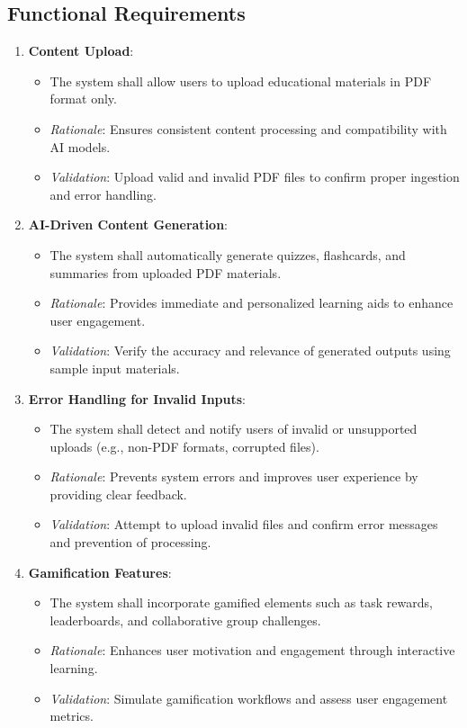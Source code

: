 \documentclass[12pt]{article}
\begin{document}
\subsection{Functional Requirements}
\begin{enumerate}

    \item \textbf{Content Upload}:
        \begin{itemize}
            \item The system shall allow users to upload educational materials in PDF format only.
            \item \textit{Rationale}: Ensures consistent content processing and compatibility with AI models.
            \item \textit{Validation}: Upload valid and invalid PDF files to confirm proper ingestion and error handling.
        \end{itemize}
        
    \item \textbf{AI-Driven Content Generation}:
        \begin{itemize}
            \item The system shall automatically generate quizzes, flashcards, and summaries from uploaded PDF materials.
            \item \textit{Rationale}: Provides immediate and personalized learning aids to enhance user engagement.
            \item \textit{Validation}: Verify the accuracy and relevance of generated outputs using sample input materials.
        \end{itemize}

    \item \textbf{Error Handling for Invalid Inputs}:
        \begin{itemize}
            \item The system shall detect and notify users of invalid or unsupported uploads (e.g., non-PDF formats, corrupted files).
            \item \textit{Rationale}: Prevents system errors and improves user experience by providing clear feedback.
            \item \textit{Validation}: Attempt to upload invalid files and confirm error messages and prevention of processing.
        \end{itemize}

    \item \textbf{Gamification Features}:
        \begin{itemize}
            \item The system shall incorporate gamified elements such as task rewards, leaderboards, and collaborative group challenges.
            \item \textit{Rationale}: Enhances user motivation and engagement through interactive learning.
            \item \textit{Validation}: Simulate gamification workflows and assess user engagement metrics.
        \end{itemize}


\end{enumerate}
\end{document}
